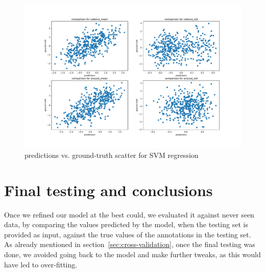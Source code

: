 \begin{figure}[h]
	\centering
	\includegraphics[width=\linewidth]{assets/predictions-scatter.pdf}
	\caption{predictions vs. ground-truth scatter for SVM regression}
	\label{fig:eval-scatter}
\end{figure}

\section{Final testing and conclusions}\label{sec:conclusions}

Once we refined our model at the best could, we evaluated it against never seen data, by comparing the values predicted by the model, when the testing set is provided as input, against the true values of the annotations in the testing set. As already mentioned in section~\ref{sec:cross-validation}, once the final testing was done, we avoided going back to the model and make further tweaks, as this would have led to over-fitting.

\begin{table}
	\centering
	\caption{Final evaluation metrics}
	\label{table:eval-metrics}
\end{table}

